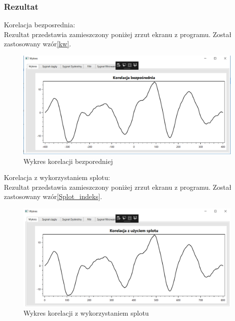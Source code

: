 \documentclass[12pt]{article}
\begin{document}
\subsubsection{Rezultat}
\newpage
Korelacja bezposrednia:
\\Rezultat przedstawia zamieszczony poniżej zrzut ekranu z programu.  Został zastosowany wzór\ref{kw}.
\begin{figure}[h!]
 \centering
 \includegraphics[width=12.3cm]{korB.PNG}
 \vspace{-0.3cm}
 \caption{Wykres korelacji bezporedniej}
 \label{wk}
\end{figure}

Korelacja z wykorzystaniem splotu:
\\Rezultat przedstawia zamieszczony poniżej zrzut ekranu z programu.  Został zastosowany wzór\ref{Splot_indeks}.
\begin{figure}[h!]
 \centering
 \includegraphics[width=12.3cm]{korS.PNG}
 \vspace{-0.3cm}
 \caption{Wykres korelacji z wykorzystaniem splotu}
 \label{Wykres dla wynikw eksperymentu pierwszego}
\end{figure}

\end{document}
